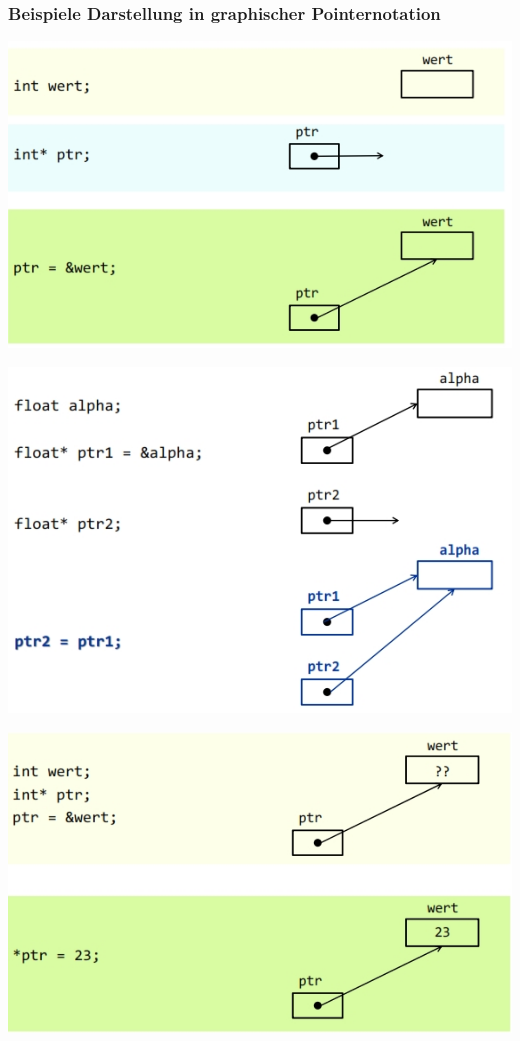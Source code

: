 	\subsubsection{Beispiele Darstellung in graphischer Pointernotation}		
		\begin{minipage}[t]{6 cm}
			\includegraphics[width=1\textwidth]{pics/pointer_beispiel_1.jpg}
		\end{minipage}	
		\begin{minipage}[t]{6 cm}
			\includegraphics[width=1\textwidth]{pics/pointer_beispiel_2.jpg}
		\end{minipage}	
		\begin{minipage}[t]{6 cm}
			\includegraphics[width=1\textwidth]{pics/pointer_beispiel_3.jpg}
		\end{minipage}

